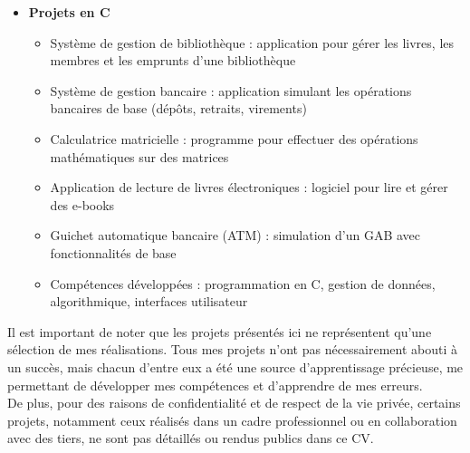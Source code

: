 \documentclass[letterpaper,11pt]{article}
\begin{document}
\begin{itemize}[label={}]
\item \textbf{Projets en C}
\begin{itemize}
\item Système de gestion de bibliothèque : application pour gérer les livres, les membres et les emprunts d'une bibliothèque
\item Système de gestion bancaire : application simulant les opérations bancaires de base (dépôts, retraits, virements)
\item Calculatrice matricielle : programme pour effectuer des opérations mathématiques sur des matrices
\item Application de lecture de livres électroniques : logiciel pour lire et gérer des e-books
\item Guichet automatique bancaire (ATM) : simulation d'un GAB avec fonctionnalités de base
\item Compétences développées : programmation en C, gestion de données, algorithmique, interfaces utilisateur
\end{itemize}
\end{itemize}
Il est important de noter que les projets présentés ici ne représentent qu'une sélection de mes réalisations. Tous mes projets n'ont pas nécessairement abouti à un succès, mais chacun d'entre eux a été une source d'apprentissage précieuse, me permettant de développer mes compétences et d'apprendre de mes erreurs.\\
De plus, pour des raisons de confidentialité et de respect de la vie privée, certains projets, notamment ceux réalisés dans un cadre professionnel ou en collaboration avec des tiers, ne sont pas détaillés ou rendus publics dans ce CV.
\end{document}
